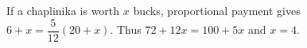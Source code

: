 If a chaplinika is worth $x$ bucks, proportional payment gives $6+x=\dfrac{5}{12}(20+x)$. Thus $72+12x=100+5x$ and $\boxed{x=4}$.
